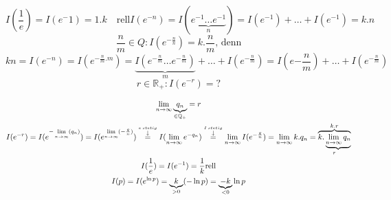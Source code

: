  \begin{equation}
 	I(\frac{1}{e})= I(e^-1)= 1.k   \quad \text{rell}
 		I(e^{-n})= I(\underbrace{e^{-1} \dots e^{-1}}_n )= I (e^{-1})+\dots+ I(e^{-1})= k.n 
 		\end{equation}
 		 \begin{equation}
 		\frac{n}{m} \in Q : I ( e^{-\frac{n}{n}})= k. \frac{n}{m}\text{, denn}
 		\end{equation}
 		\begin{equation}
 		kn=I(e^{-n}) = I(e^{-\frac{n}{m} . m})= \underbrace{I ( e^{-\frac{n}{m}} \dots  e^{-\frac{n}{m}} )}_{m}+\dots + I (e^{-\frac{n}{m}})= I(e{-\frac{n}{m}})+ \dots + I(e^{-\frac{n}{m}}) 
 		\end{equation}
 		\begin{equation}
 		r \in \mathbb{R}_+ : I(e^{-r})=?
  		\end{equation}

\begin{gather*}
	\lim\limits_{n \rightarrow \infty} \underbrace{q_n}_{\in \mathbb{Q_+}}= r \\
	I(e^{-r})= I(e^{-\lim\limits_{n \rightarrow \infty} (q_n)})
	= I (e^{\lim\limits_{n \rightarrow \infty} (-\frac{q}{n})})
		\overset{\overset{e \: stetig}{\downarrow}}{=} I(\lim\limits_{n \rightarrow \infty} e^{-q_n})	\overset{\overset{I \: stetig}{\downarrow}}{=} \lim\limits_{n \rightarrow \infty} I(e^{-\frac{q}{n}})	
	= \lim\limits_{n \rightarrow \infty} k.q_n
	=\overbrace{k.\underbrace{\lim\limits_{n \rightarrow \infty} q_n}}_{r}^{k.r}\\
	I(\frac{1}{e})= I(e^{-1})= \frac{1}{k} \text{rell} \\
	I(p)=I(e^{\ln p}) = \underbrace{k}_{>0}(- \ln p) =\underbrace{-k}_{<0} \ln p
\end{gather*}


